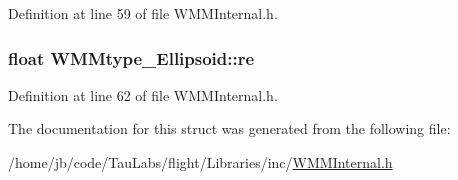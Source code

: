 \-Definition at line 59 of file \-W\-M\-M\-Internal.\-h.

\hypertarget{struct_w_m_mtype___ellipsoid_aca51be6e99eef3c6a7a7f16c292e60c5}{
\subsubsection[{re}]{\setlength{\rightskip}{0pt plus 5cm}float {\bf \-W\-M\-Mtype\-\_\-\-Ellipsoid\-::re}}}\label{struct_w_m_mtype___ellipsoid_aca51be6e99eef3c6a7a7f16c292e60c5}


\-Definition at line 62 of file \-W\-M\-M\-Internal.\-h.



\-The documentation for this struct was generated from the following file\-:\begin{DoxyCompactItemize}
\item 
/home/jb/code/\-Tau\-Labs/flight/\-Libraries/inc/\hyperlink{_w_m_m_internal_8h}{\-W\-M\-M\-Internal.\-h}\end{DoxyCompactItemize}
